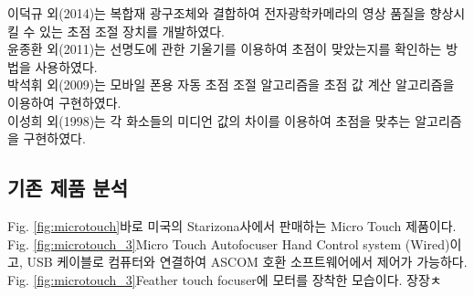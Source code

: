 이덕규 외(2014)는 복합재 광구조체와 결합하여 전자광학카메라의 영상 품질을 향상시킬 수 있는 초점 조절 장치를 개발하였다.\cite{leedukgu2014}\\
윤종환 외(2011)는 선명도에 관한 기울기를 이용하여 초점이 맞았는지를 확인하는 방법을 사용하였다.\cite{yunjonghwan2011lcd}\\
박석휘 외(2009)는 모바일 폰용 자동 초점 조절 알고리즘을 초점 값 계산 알고리즘을 이용하여 구현하였다.\cite{parksukhui2009Median}\\
이성희 외(1998)는 각 화소들의 미디언 값의 차이를 이용하여 초점을 맞추는 알고리즘을 구현하였다.\cite{leeseonghee1998Median}


\subsection{기존 제품 분석}

Fig. \ref{fig:microtouch}\가 바로 미국의 Starizona사에서 판매하는 Micro Touch  제품이다. Fig. \ref{fig:microtouch_3}\가 Micro Touch Autofocuser Hand Control system (Wired)이고, USB 케이블로 컴퓨터와 연결하여 ASCOM 호환 소프트웨어에서 제어가 가능하다.  Fig. \ref{fig:microtouch_3}\는 Feather touch focuser에 모터를 장착한 모습이다. 장장ㅊ


